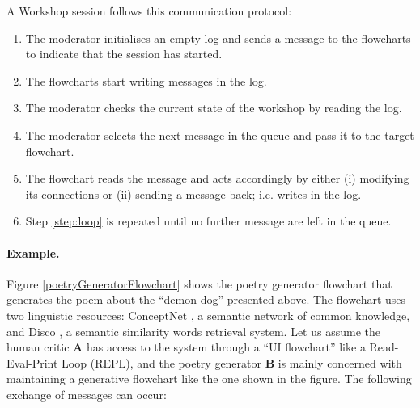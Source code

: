 A Workshop session follows this communication protocol:
\begin{enumerate}
\item The moderator initialises an empty log and sends a message to the flowcharts to indicate that the session has started. 
\item The flowcharts start writing messages in the log.
\item The moderator checks the current state of the workshop by reading the log. \label{step:loop}
\item The moderator selects the next message in the queue and pass it to the target flowchart. 
\item The flowchart reads the message and acts accordingly by either (i) modifying its connections or (ii) sending a message back; i.e. writes in the log. 
\item Step \ref{step:loop} is repeated until no further message are left in the queue.
\end{enumerate}


\paragraph{Example.}
Figure \ref{poetryGeneratorFlowchart} shows the poetry generator flowchart that generates the poem about the ``demon dog'' presented above. The flowchart uses two linguistic resources: ConceptNet \cite{ConceptNet}, a semantic network of common knowledge, and Disco \cite{Disco}, a semantic similarity words retrieval system. Let us assume the human critic $\mathbf{A}$ has access to the system through a ``UI flowchart'' like a Read-Eval-Print Loop (REPL), and the poetry generator $\mathbf{B}$ is mainly concerned with maintaining a generative flowchart like the one shown in the figure. The following exchange of messages can occur:

